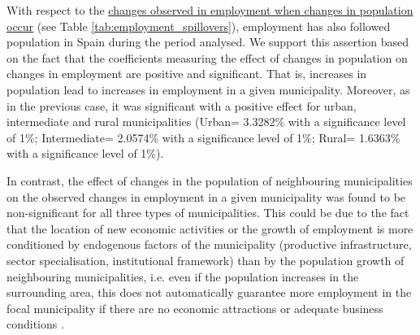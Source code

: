 \documentclass[a4paper,11pt,oneside]{article}
\begin{document}




\begin{sloppypar}
With respect to the \underline{changes observed in employment when changes in population occur} (see Table \ref{tab:employment_spillovers}), employment has also followed population in Spain during the period analysed. We support this assertion based on the fact that the coefficients measuring the effect of changes in population on changes in employment are positive and significant. That is, increases in population lead to increases in employment in a given municipality. Moreover, as in the previous case, it was significant with a positive effect for urban, intermediate and rural municipalities (Urban= 3.3282\% with a significance level of 1\%; Intermediate= 2.0574\% with a significance level of 1\%; Rural= 1.6363\% with a significance level of 1\%).
\end{sloppypar}




In contrast, the effect of changes in the population of neighbouring municipalities on the observed changes in employment in a given municipality was found to be non-significant for all three types of municipalities. This could be due to the fact that the location of new economic activities or the growth of employment is more conditioned by endogenous factors of the municipality (productive infrastructure, sector specialisation, institutional framework) than by the population growth of neighbouring municipalities, i.e. even if the population increases in the surrounding area, this does not automatically guarantee more employment in the focal municipality if there are no economic attractions or adequate business conditions \citep{arauzo2007determinants}.




\end{document}
